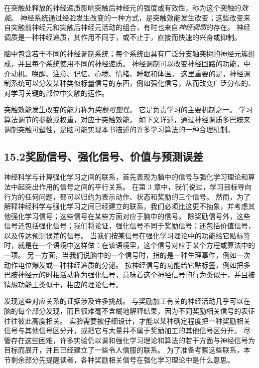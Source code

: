 \documentclass[UTF8,12pt,a4paper,fontset=fandol]{ctexart}
\begin{document}
在突触处释放的神经递质影响突触后神经元的强度或有效性，称为这个突触的\textit{效能}。
神经系统通过经验发生改变的一种方式，是突触效能发生改变；这些改变来自突触前神经元和突触后神经元活动的组合，有时也来自\textit{神经调质}的存在。
神经调质是一种神经递质，其作用不同于，或不止于，直接而快速的兴奋或抑制。

脑中包含若干不同的神经调制系统；每个系统由具有广泛分支轴突树的神经元簇组成，并且每个系统使用不同的神经递质。
神经调制可以改变神经回路的功能，中介动机、唤醒、注意、记忆、心境、情绪、睡眠和体温。
这里重要的是，神经调制系统可以分发某种类似标量信号的东西，例如强化信号，从而改变广泛分布的、对学习关键的部位中突触的运作。

突触效能发生改变的能力称为\textit{突触可塑性}。
它是负责学习的主要机制之一。
学习算法调节的参数或权重，对应于突触效能。
如下文详述，通过神经调质多巴胺来调制突触可塑性，是脑可能实现本书描述的许多学习算法的一种合理机制。

\subsection*{15.2\quad 奖励信号、强化信号、价值与预测误差}

神经科学与计算强化学习之间的联系，首先表现为脑中的信号与强化学习理论和算法中起突出作用的信号之间的平行关系。
在第 3 章中，我们说过，学习目标导向行为的任何问题，都可以归约为表示动作、状态和奖励的三个信号。
然而，为了解释神经科学与强化学习之间已经建立的联系，我们必须比这更不抽象，并考虑其他强化学习信号；这些信号在某些方面对应于脑中的信号。
除奖励信号外，这些信号还包括强化信号；我们将论证，强化信号不同于奖励信号；还包括价值信号，以及传达预测误差的信号。
当我们按某信号在强化学习理论中的功能给它贴标签时，就是在一个语境中这样做：在该语境里，这个信号对应于某个方程或算法中的一项。
另一方面，当我们说脑中的一个信号时，指的是一种生理事件，例如一次动作电位爆发或一种神经递质的分泌。
按神经信号的功能给它贴标签，例如把多巴胺神经元的时相活动称为强化信号，意味着这个神经信号的行为类似于，并且被猜想功能上类似于，相应的理论信号。

发现这些对应关系的证据涉及许多挑战。
与奖励加工有关的神经活动几乎可以在脑的每个部分发现，而且很难毫不含糊地解释结果，因为不同奖励相关信号的表征往往彼此高度相关。
实验需要被仔细设计，才能以某种确定程度把一种奖励相关信号与其他信号区分开，或把它与大量并不属于奖励加工的其他信号区分开。
尽管存在这些困难，许多实验仍以调和强化学习理论和算法的若干方面与神经信号为目标而展开，并且已经建立了一些令人信服的联系。
为了准备考察这些联系，本节剩余部分先提醒读者，各种奖励相关信号在强化学习理论中是什么意思。
\end{document}
